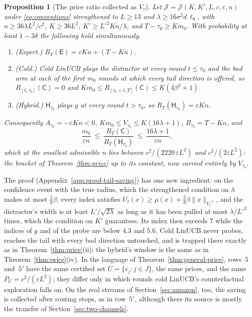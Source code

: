 \documentclass{article}
\newtheorem{proposition}{Proposition}
\theoremstyle{definition}
\theoremstyle{remark}
\newcommand{\eps}{\varepsilon}
\theoremstyle{remark}
\newcommand{\Cold}{\mathsf{C}}
\newcommand{\Exp}{\mathsf{E}}
\newcommand{\Hyb}{\mathsf{H}}
\begin{document}
\begin{proposition}[The price ratio collected as $V_\tau$]
\label{prop:cat-tail-saving}
Let $\mathcal J=\mathcal J(K,K',L,c,\eps,n)$ under \eqref{eq:conventions}
strengthened to $L\ge13$ and $\lambda\ge16\sigma^2d\,\ell_0$, with
$n\ge36\lambda L^2/c^2$, $K\ge36L^2$, $K'\ge L'^2Kn/\lambda$, and
$T-\tau_0\ge Km_0$. With probability at least $1-3\delta$ the following hold
simultaneously.
\begin{enumerate}[itemsep=1pt,topsep=1pt,leftmargin=*]
\item[(i)] \emph{(Expert.)} $R_T(\Exp)=\eps Kn+(T-Kn)$.
\item[(ii)] \emph{(Cold.)} Cold LinUCB plays the distractor at every round
$t\le\tau_0$ and the bad arm at each of the first $m_0$ rounds at which every
tail direction is offered, so $R_{[1,\tau_0]}(\Cold)=0$ and
$Km_0\le R_{[\tau_0+1,T]}(\Cold)\le K(4\beta^2+1)$.
\item[(iii)] \emph{(Hybrid.)} $\Hyb_{\tau_0}$ plays $g$ at every round
$t>\tau_0$, so $R_T(\Hyb_{\tau_0})=\eps Kn$.
\end{enumerate}
Consequently $A_{\tau_0}=-\eps Kn<0$, $Km_0\le V_{\tau_0}\le K(16\lambda+1)$,
$B_{\tau_0}=T-Kn$, and
\[
\frac{m_0}{\eps n}\ \le\ \frac{R_T(\Cold)}{R_T(\Hyb_{\tau_0})}\ \le\ \frac{16\lambda+1}{\eps n},
\]
which at the smallest admissible $n$ lies between $c^2/(2220\,\eps L^2)$ and
$c^2/(2\eps L^2)$: the bracket of Theorem~\ref{thm:price} up to its constant,
now carried entirely by $V_{\tau_0}$.
\end{proposition}

The proof (Appendix~\ref{app:proof-tail-saving}) has one new ingredient: on
the confidence event with the true radius, which the strengthened condition
on $\lambda$ makes at most $\tfrac58\beta$, every index satisfies
$U_t(x)\ge\mu(x)+\tfrac38\beta\|x\|_{V_t^{-1}}$, and the distractor's width is
at least $L'/\sqrt{2\lambda}$ as long as it has been pulled at most
$\lambda/L'^2$ times, which the condition on $K'$ guarantees. Its index then
exceeds $7$ while the indices of $g$ and of the probe are below $4.3$ and
$5.6$. Cold LinUCB never probes, reaches the tail with every bad direction
untouched, and is trapped there exactly as in Theorem~\ref{thm:price}(ii);
the hybrid's window is the same as in Theorem~\ref{thm:price}(iv). In the
language of Theorem~\ref{thm:general-price}, rows~5 and~$5'$ have the same
certified set $U=\{e_j:j\in J\}$, the same prices, and the same $P_U=c^2/(\eps L^2)$;
they differ only in which rounds cold LinUCB's counterfactual exploration
falls on. On the real streams of Section~\ref{sec:amazon}, too, the saving
is collected after routing stops, as in row~$5'$, although there its source
is mostly the transfer of Section~\ref{sec:two-channels}.
\end{document}
